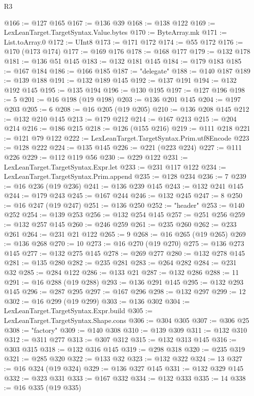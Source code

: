 \begin{lexlean}{R3}
\begin{coremodule}
@166 := @127 @165
@167 := @136 @39
@168 := @138 @122
@169 := LexLeanTarget.TargetSyntax.Value.bytes
@170 := ByteArray.mk
@171 := List.toArray.{0}
@172 := UInt8
@173 := @171 @172
@174 := @55 @172
@176 := @170 (@173 @174)
@177 := @169 @176
@178 := @168 @177
@179 := @132 @178
@181 := @136 @51 @145
@183 := @132 @181 @145
@184 := @179 @183
@185 := @167 @184
@186 := @166 @185
@187 := "delegate"
@188 := @140 @187
@189 := @139 @188
@191 := @132 @189 @145
@192 := @137 @191
@194 := @132 @192 @145
@195 := @135 @194
@196 := @130 @195
@197 := @127 @196
@198 := 5
@201 := @16 @198 (@19 @198)
@203 := @136 @201 @145
@204 := @197 @203
@205 := 6
@208 := @16 @205 (@19 @205)
@210 := @136 @208 @145
@212 := @132 @210 @145
@213 := @179 @212
@214 := @167 @213
@215 := @204 @214
@216 := @186 @215
@218 := @126 (@155 @216)
@219 := @111 @218
@221 := @121 @79 @122
@222 := LexLeanTarget.TargetSyntax.Prim.utf8Encode
@223 := @128 @222
@224 := @135 @145
@226 := @221 (@223 @224)
@227 := @111 @226
@229 := @112 @119 @56
@230 := @229 @122
@231 := LexLeanTarget.TargetSyntax.Expr.let
@233 := @231 @117 @122
@234 := LexLeanTarget.TargetSyntax.Prim.append
@235 := @128 @234
@236 := 7
@239 := @16 @236 (@19 @236)
@241 := @136 @239 @145
@243 := @132 @241 @145
@244 := @179 @243
@245 := @167 @244
@246 := @132 @245
@247 := 8
@250 := @16 @247 (@19 @247)
@251 := @136 @250
@252 := "header"
@253 := @140 @252
@254 := @139 @253
@256 := @132 @254 @145
@257 := @251 @256
@259 := @132 @257 @145
@260 := @246 @259
@261 := @235 @260
@262 := @233 @261
@264 := @231 @21 @122
@265 := 9
@268 := @16 @265 (@19 @265)
@269 := @136 @268
@270 := 10
@273 := @16 @270 (@19 @270)
@275 := @136 @273 @145
@277 := @132 @275 @145
@278 := @269 @277
@280 := @132 @278 @145
@281 := @135 @280
@282 := @235 @281
@283 := @264 @282
@284 := @231 @32
@285 := @284 @122
@286 := @133 @21
@287 := @132 @286
@288 := 11
@291 := @16 @288 (@19 @288)
@293 := @136 @291 @145
@295 := @132 @293 @145
@296 := @287 @295
@297 := @167 @296
@298 := @132 @297
@299 := 12
@302 := @16 @299 (@19 @299)
@303 := @136 @302
@304 := LexLeanTarget.TargetSyntax.Expr.build
@305 := LexLeanTarget.TargetSyntax.Shape.cons
@306 := @304 @305
@307 := @306 @25
@308 := "factory"
@309 := @140 @308
@310 := @139 @309
@311 := @132 @310
@312 := @311 @277
@313 := @307 @312
@315 := @132 @313 @145
@316 := @303 @315
@318 := @132 @316 @145
@319 := @298 @318
@320 := @235 @319
@321 := @285 @320
@322 := @133 @32
@323 := @132 @322
@324 := 13
@327 := @16 @324 (@19 @324)
@329 := @136 @327 @145
@331 := @132 @329 @145
@332 := @323 @331
@333 := @167 @332
@334 := @132 @333
@335 := 14
@338 := @16 @335 (@19 @335)

\end{coremodule}
\end{lexlean}
